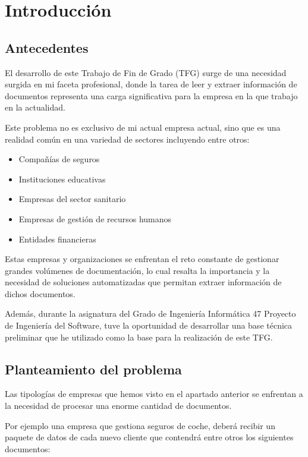 \chapter{Introducción}\label{ch:chapter_1}


\section{Antecedentes}

El desarrollo de este Trabajo de Fin de Grado (TFG) surge de una necesidad surgida en mi faceta profesional, donde la
tarea de leer y extraer información de documentos representa una carga significativa para la empresa en la que trabajo
en la actualidad.

Este problema no es exclusivo de mi actual empresa actual, sino que es una realidad común en una variedad de sectores
incluyendo entre otros:

\begin{itemize}
    \item Compañías de seguros
    \item Instituciones educativas
    \item Empresas del sector sanitario
    \item Empresas de gestión de recursos humanos
    \item Entidades financieras
\end{itemize}

Estas empresas y organizaciones se enfrentan el reto constante de gestionar grandes volúmenes de documentación, lo cual
resalta la importancia y la necesidad de soluciones automatizadas que permitan extraer información de dichos documentos.

Además, durante la asignatura del Grado de Ingeniería Informática 47 Proyecto de Ingeniería del Software, tuve la
oportunidad de desarrollar una base técnica preliminar que he utilizado como la base para la realización de este TFG\@.


\section{Planteamiento del problema}

Las tipologías de empresas que hemos visto en el apartado anterior se enfrentan a la necesidad de procesar una enorme
cantidad de documentos.

Por ejemplo una empresa que gestiona seguros de coche, deberá recibir un paquete de datos de cada nuevo cliente que
contendrá entre otros los siguientes documentos:

